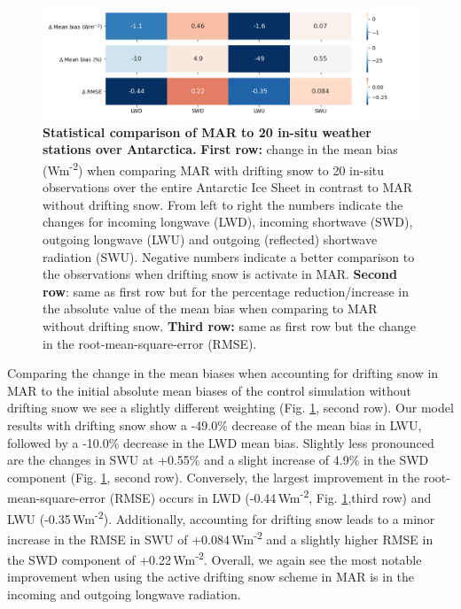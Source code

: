 \documentclass[draft]{agujournal2019}
\begin{document}
\begin{figure}[H]
	\includegraphics[width=1.1\textwidth]{heatmap_new.png}
	\caption{\textbf{Statistical comparison of MAR to 20 in-situ weather stations over Antarctica.} \textbf{First row:} change in the mean bias (Wm\textsuperscript{-2}) when comparing MAR with drifting snow to 20 in-situ observations over the entire Antarctic Ice Sheet in contrast to MAR without drifting snow. From left to right the numbers indicate the changes for incoming longwave (LWD), incoming shortwave (SWD), outgoing longwave (LWU) and outgoing (reflected) shortwave radiation (SWU). Negative numbers indicate a better comparison to the observations when drifting snow is activate in MAR. \textbf{Second row}: same as first row but for the percentage reduction/increase in the absolute value of the mean bias when comparing to MAR without drifting snow. \textbf{Third row:} same as first row but the change in the root-mean-square-error (RMSE).}
	\label{fig:heat}
\end{figure}

Comparing the change in the mean biases when accounting for drifting snow in MAR to the initial absolute mean biases of the control simulation without drifting snow we see a slightly different weighting (Fig. \ref{fig:heat}, second row). Our model results with drifting snow show a -49.0\% decrease of the mean bias in LWU, followed by a -10.0\% decrease in the LWD mean bias. Slightly less pronounced are the changes in SWU at +0.55\% and a slight increase of 4.9\% in the SWD component (Fig. \ref{fig:heat}, second row). Conversely, the largest improvement in the root-mean-square-error (RMSE) occurs in LWD (-0.44\,Wm\textsuperscript{-2}, Fig. \ref{fig:heat},third row) and LWU (-0.35\,Wm\textsuperscript{-2}).  Additionally, accounting for drifting snow leads to a minor increase in the RMSE in SWU of +0.084\,Wm\textsuperscript{-2} and a slightly higher RMSE in the SWD component of +0.22\,Wm\textsuperscript{-2}. Overall, we again see the most notable improvement when using the active drifting snow scheme in MAR is in the incoming and outgoing longwave radiation.
\end{document}
